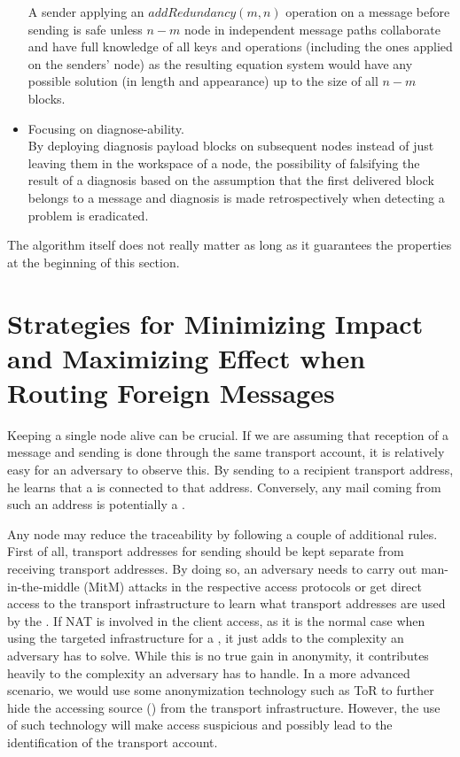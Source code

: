 \begin{itemize}
	A sender applying an $addRedundancy(m,n)$ operation on a message before sending is safe unless $n-m$ node in independent message paths collaborate and have full knowledge of all keys and operations (including the ones applied on the senders' node) as the resulting equation system would have any possible solution (in length and appearance) up to the size of all $n-m$ blocks.
	\item Focusing on diagnose-ability.\\
	By deploying diagnosis payload blocks on subsequent nodes instead of just leaving them in the workspace of a node, the possibility of falsifying the result of a diagnosis based on the assumption that the first delivered block belongs to a message and diagnosis is made retrospectively when detecting a problem is eradicated.
\end{itemize}

The algorithm itself does not really matter as long as it guarantees the properties at the beginning of this section.

\section{Strategies for Minimizing Impact and Maximizing Effect when Routing Foreign Messages}
Keeping a single node alive can be crucial. If we are assuming that reception of a message and sending is done through the same transport account, it is relatively easy for an adversary to observe this. By sending to a recipient transport address, he learns that a \VortexNode{} is connected to that address. Conversely, any mail coming from such an address is potentially a \VortexMessage{}.

Any node may reduce the traceability by following a couple of additional rules. First of all, transport addresses for sending should be kept separate from receiving transport addresses. By doing so, an adversary needs to carry out man-in-the-middle (MitM) attacks in the respective access protocols or get direct access to the transport infrastructure to learn what transport addresses are used by the \VortexNode{}. If NAT is involved in the client access, as it is the normal case when using the targeted infrastructure for a \VortexNode, it just adds to the complexity an adversary has to solve. While this is no true gain in anonymity, it contributes heavily to the complexity an adversary has to handle. In a more advanced scenario, we would use some anonymization technology such as ToR to further hide the accessing source (\VortexNode) from the transport infrastructure. However, the use of such technology will make access suspicious and possibly lead to the identification of the transport account.

